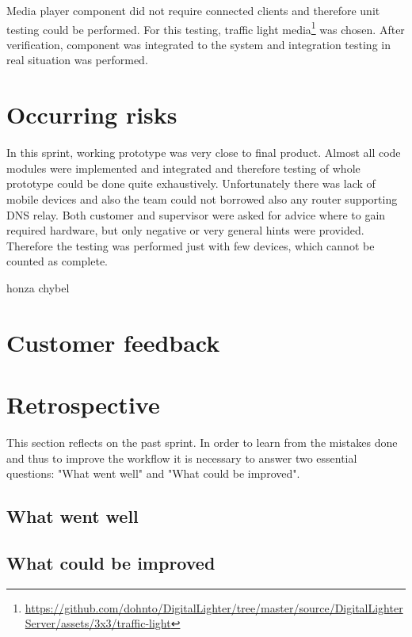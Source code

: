 Media player component did not require connected clients and therefore unit testing could be performed.
For this testing, traffic light media\footnote{\url{https://github.com/dohnto/DigitalLighter/tree/master/source/DigitalLighterServer/assets/3x3/traffic-light}} was chosen.
After verification, component was integrated to the system and integration testing in real situation was performed.

\section{Occurring risks}
In this sprint, working prototype was very close to final product.
Almost all code modules were implemented and integrated and therefore testing of whole prototype could be done quite exhaustively.
Unfortunately there was lack of mobile devices and also the team could not borrowed also any router supporting DNS relay.
Both customer and supervisor were asked for advice where to gain required hardware, but only negative or very general hints were provided.
Therefore the testing was performed just with few devices, which cannot be counted as complete.


honza chybel



\section{Customer feedback}
\section{Retrospective}
This section reflects on the past sprint. In order to learn from the mistakes done and thus to improve the workflow it is necessary to answer two essential questions: "What went well" and "What could be improved".

\subsection{What went well}
\subsection{What could be improved}
